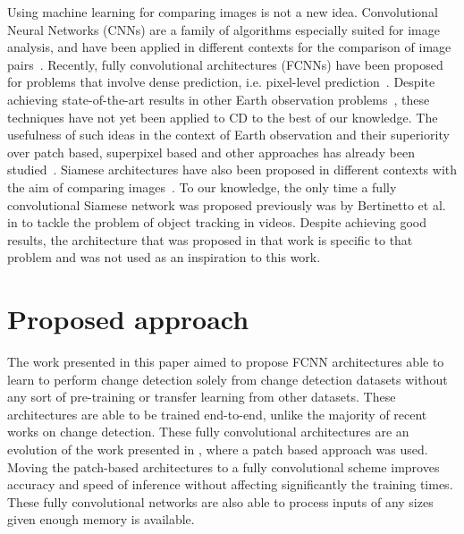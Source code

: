 \documentclass{article}
\begin{document}
Using machine learning for comparing images is not a new idea. Convolutional Neural Networks (CNNs) are a family of algorithms especially suited for image analysis, and have been applied in different contexts for the comparison of image pairs~\cite{chopra2005learning,zagoruyko2015learning,stent2015detecting}. Recently, fully convolutional architectures (FCNNs) have been proposed for problems that involve dense prediction, i.e. pixel-level prediction~\cite{long2015fully,ronneberger2015u,bertinetto2016fully}. Despite achieving state-of-the-art results in other Earth observation problems~\cite{audebert2017beyond}, these techniques have not yet been applied to CD to the best of our knowledge. The usefulness of such ideas in the context of Earth observation and their superiority over patch based, superpixel based and other approaches has already been studied~\cite{audebert2017segment}. Siamese architectures have also been proposed in different contexts with the aim of comparing images~\cite{bromley1994signature,zagoruyko2015learning}. To our knowledge, the only time a fully convolutional Siamese network was proposed previously was by Bertinetto et al. in \cite{bertinetto2016fully} to tackle the problem of object tracking in videos. Despite achieving good results, the architecture that was proposed in that work is specific to that problem and was not used as an inspiration to this work.


















\section{Proposed approach}
\label{sec:proposed}

The work presented in this paper aimed to propose FCNN architectures able to learn to perform change detection solely from change detection datasets without any sort of pre-training or transfer learning from other datasets. These architectures are able to be trained end-to-end, unlike the majority of recent works on change detection. These fully convolutional architectures are an evolution of the work presented in \cite{daudt2018urban}, where a patch based approach was used. Moving the patch-based architectures to a fully convolutional scheme improves accuracy and speed of inference without affecting significantly the training times. These fully convolutional networks are also able to process inputs of any sizes given enough memory is available.
\end{document}
